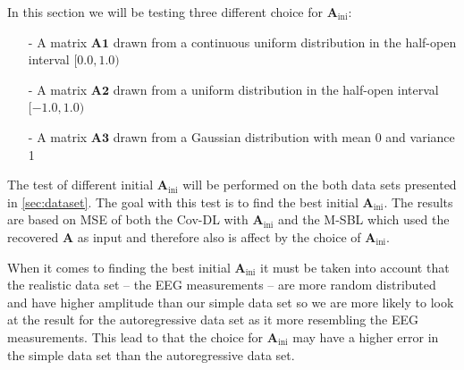 In this section we will be testing three different choice for $\mathbf{A}_{\text{ini}}$:
\begin{itemize}
\item[-] A matrix $\mathbf{A1}$ drawn from a continuous uniform distribution in the half-open interval $[0.0, 1.0)$
\item[-] A matrix $\mathbf{A2}$ drawn from a uniform distribution in the half-open interval $[-1.0, 1.0)$
\item[-] A matrix $\mathbf{A3}$ drawn from a Gaussian distribution with mean 0 and variance 1
\end{itemize}
The test of different initial $\mathbf{A}_{\text{ini}}$ will be performed on the both data sets presented in \ref{sec:dataset}. The goal with this test is to find the best initial $\mathbf{A}_{\text{ini}}$. The results are based on MSE of both the Cov-DL with $\mathbf{A}_{\text{ini}}$ and the M-SBL which used the recovered $\mathbf{A}$ as input and therefore also is affect by the choice of $\mathbf{A}_{\text{ini}}$.

When it comes to finding the best initial $\mathbf{A}_{\text{ini}}$ it must be taken into account that the realistic data set -- the EEG measurements -- are more random distributed and have higher amplitude than our simple data set so we are more likely to look at the result for the autoregressive data set as it more resembling the EEG measurements. This lead to that the choice for $\mathbf{A}_{\text{ini}}$ may have a higher error in the simple data set than the autoregressive data set.

